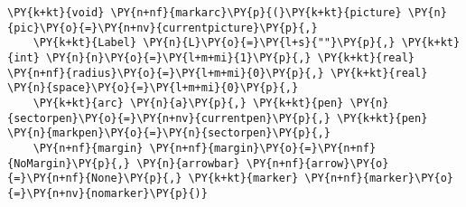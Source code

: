 \begin{Verbatim}[commandchars=\\\{\}]
    \PY{k+kt}{void} \PY{n+nf}{markarc}\PY{p}{(}\PY{k+kt}{picture} \PY{n}{pic}\PY{o}{=}\PY{n+nv}{currentpicture}\PY{p}{,}
    \PY{k+kt}{Label} \PY{n}{L}\PY{o}{=}\PY{l+s}{""}\PY{p}{,} \PY{k+kt}{int} \PY{n}{n}\PY{o}{=}\PY{l+m+mi}{1}\PY{p}{,} \PY{k+kt}{real} \PY{n+nf}{radius}\PY{o}{=}\PY{l+m+mi}{0}\PY{p}{,} \PY{k+kt}{real} \PY{n}{space}\PY{o}{=}\PY{l+m+mi}{0}\PY{p}{,}
    \PY{k+kt}{arc} \PY{n}{a}\PY{p}{,} \PY{k+kt}{pen} \PY{n}{sectorpen}\PY{o}{=}\PY{n+nv}{currentpen}\PY{p}{,} \PY{k+kt}{pen} \PY{n}{markpen}\PY{o}{=}\PY{n}{sectorpen}\PY{p}{,}
    \PY{n+nf}{margin} \PY{n+nf}{margin}\PY{o}{=}\PY{n+nf}{NoMargin}\PY{p}{,} \PY{n}{arrowbar} \PY{n+nf}{arrow}\PY{o}{=}\PY{n+nf}{None}\PY{p}{,} \PY{k+kt}{marker} \PY{n+nf}{marker}\PY{o}{=}\PY{n+nv}{nomarker}\PY{p}{)}
\end{Verbatim}
